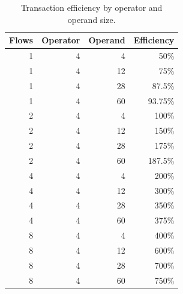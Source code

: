 \documentclass[../OAE-SPEC-MAIN.tex]{subfiles}
\begin{document}







\begin{table}[ht]
\centering
\caption{Transaction efficiency by operator and operand size.}
\label{tab:txn-efficiency}

\footnotesize
\setlength{\tabcolsep}{3pt} %
\begin{tabular}{@{}r r r r@{}}
\toprule
Flows & Operator & Operand & Efficiency \\ \midrule
1 & 4 & 4  & 50\%   \\
1 & 4 & 12 & 75\%   \\
1 & 4 & 28 & 87.5\% \\
1 & 4 & 60 & 93.75\%\\
2 & 4 & 4  & 100\%  \\
2 & 4 & 12 & 150\%  \\
2 & 4 & 28 & 175\%  \\
2 & 4 & 60 & 187.5\%\\
4 & 4 & 4  & 200\%  \\
4 & 4 & 12 & 300\%  \\
4 & 4 & 28 & 350\%  \\
4 & 4 & 60 & 375\%  \\
8 & 4 & 4  & 400\%  \\
8 & 4 & 12 & 600\%  \\
8 & 4 & 28 & 700\%  \\
8 & 4 & 60 & 750\%  \\ \bottomrule
\end{tabular}
\end{table}
\end{document}
